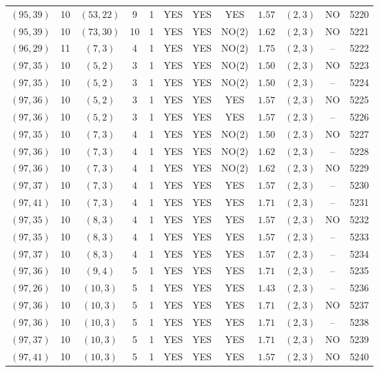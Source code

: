 \begin{longtable}{|c|c|c|c|c|c|c|c|c|c|c|c|}
$(95,39)$ & 10 & $(53,22)$ & 9 & 1 & YES & YES & YES & $1.57$ & $(2,3)$ & NO & 5220\\
$(95,39)$ & 10 & $(73,30)$ & 10 & 1 & YES & YES & NO(2) & $1.62$ & $(2,3)$ & NO & 5221\\
$(96,29)$ & 11 & $(7,3)$ & 4 & 1 & YES & YES & NO(2) & $1.75$ & $(2,3)$ & -- & 5222\\
$(97,35)$ & 10 & $(5,2)$ & 3 & 1 & YES & YES & NO(2) & $1.50$ & $(2,3)$ & NO & 5223\\
$(97,35)$ & 10 & $(5,2)$ & 3 & 1 & YES & YES & NO(2) & $1.50$ & $(2,3)$ & -- & 5224\\
$(97,36)$ & 10 & $(5,2)$ & 3 & 1 & YES & YES & YES & $1.57$ & $(2,3)$ & NO & 5225\\
$(97,36)$ & 10 & $(5,2)$ & 3 & 1 & YES & YES & YES & $1.57$ & $(2,3)$ & -- & 5226\\
$(97,35)$ & 10 & $(7,3)$ & 4 & 1 & YES & YES & NO(2) & $1.50$ & $(2,3)$ & NO & 5227\\
$(97,36)$ & 10 & $(7,3)$ & 4 & 1 & YES & YES & NO(2) & $1.62$ & $(2,3)$ & -- & 5228\\
$(97,36)$ & 10 & $(7,3)$ & 4 & 1 & YES & YES & NO(2) & $1.62$ & $(2,3)$ & NO & 5229\\
$(97,37)$ & 10 & $(7,3)$ & 4 & 1 & YES & YES & YES & $1.57$ & $(2,3)$ & -- & 5230\\
$(97,41)$ & 10 & $(7,3)$ & 4 & 1 & YES & YES & YES & $1.71$ & $(2,3)$ & -- & 5231\\
$(97,35)$ & 10 & $(8,3)$ & 4 & 1 & YES & YES & YES & $1.57$ & $(2,3)$ & NO & 5232\\
$(97,35)$ & 10 & $(8,3)$ & 4 & 1 & YES & YES & YES & $1.57$ & $(2,3)$ & -- & 5233\\
$(97,37)$ & 10 & $(8,3)$ & 4 & 1 & YES & YES & YES & $1.57$ & $(2,3)$ & -- & 5234\\
$(97,36)$ & 10 & $(9,4)$ & 5 & 1 & YES & YES & YES & $1.71$ & $(2,3)$ & -- & 5235\\
$(97,26)$ & 10 & $(10,3)$ & 5 & 1 & YES & YES & YES & $1.43$ & $(2,3)$ & -- & 5236\\
$(97,36)$ & 10 & $(10,3)$ & 5 & 1 & YES & YES & YES & $1.71$ & $(2,3)$ & NO & 5237\\
$(97,36)$ & 10 & $(10,3)$ & 5 & 1 & YES & YES & YES & $1.71$ & $(2,3)$ & -- & 5238\\
$(97,37)$ & 10 & $(10,3)$ & 5 & 1 & YES & YES & YES & $1.71$ & $(2,3)$ & NO & 5239\\
$(97,41)$ & 10 & $(10,3)$ & 5 & 1 & YES & YES & YES & $1.57$ & $(2,3)$ & NO & 5240\\

\end{longtable}
